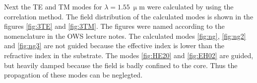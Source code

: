 Next the TE and TM modes for $\lambda = 1.55~\upmu$m were calculated by using the correlation method. The field distribution of the calculated modes is shown in the figures \ref{fig:3TE} and \ref{fig:3TM}. The figures were named according to the nomenclature in the OWS lecture notes. The calculated modes \ref{fig:ng}, \ref{fig:ng2} and \ref{fig:ng3} are not guided because the effective index is lower than the refractive index in the substrate. The modes \ref{fig:HE20} and \ref{fig:EH02} are guided, but heavily damped because the field is badly confined to the core. Thus the propagation of these modes can be neglegted.

\begin{figure}%
\centering
	\\%

\end{figure}
